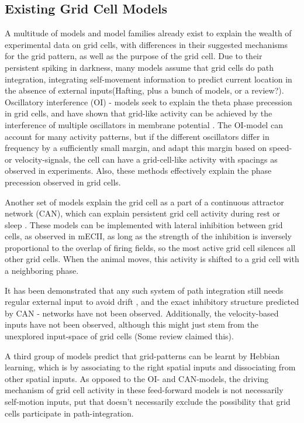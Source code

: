 \documentclass{article}
\begin{document}
    \subsection{Existing Grid Cell Models}
    A multitude of models and model families already exist to explain the wealth of experimental data on grid cells, with differences in their suggested mechanisms for the grid pattern, as well as the purpose of the grid cell. Due to their persistent spiking in darkness, many models assume that grid cells do path integration, integrating self-movement information to predict current location in the absence of external inputs(Hafting, plus a bunch of models, or a review?). Oscillatory interference (OI) - models seek to explain the theta phase precession in grid cells, and have shown that grid-like activity can be achieved by the interference of multiple oscillators in membrane potential \parencite{Burgess2007,Zilli2010}. The OI-model can account for many activity patterns, but if the different oscillators differ in frequency by a sufficiently small margin, and adapt this margin based on speed- or velocity-signals, the cell can have a grid-cell-like activity with spacings as observed in experiments. Also, these methods effectively explain the phase precession observed in grid cells. 

    Another set of models explain the grid cell as a part of a continuous attractor network (CAN), which can explain persistent grid cell activity during rest or sleep \parencite{Yoon2013,Widloski2014}. These models can be implemented with lateral inhibition between grid cells, as observed in mECII, as long as the strength of the inhibition is inversely proportional to the overlap of firing fields, so the most active grid cell silences all other grid cells. When the animal moves, this activity is shifted to a grid cell with a neighboring phase.

    It has been demonstrated that any such system of path integration still needs regular external input to avoid drift \parencite{Mulas2016}, and the exact inhibitory structure predicted by CAN - networks have not been observed. Additionally, the velocity-based inputs have not been observed, although this might just stem from the unexplored input-space of grid cells (Some review claimed this).

    A third group of models predict that grid-patterns can be learnt by Hebbian learning, which is by associating to the right spatial inputs and dissociating from other spatial inputs. As opposed to the OI- and CAN-models, the driving mechanism of grid cell activity in these feed-forward models is not necessarily self-motion inputs, put that doesn't necessarily exclude the possibility that grid cells participate in path-integration. 
    
\end{document}
